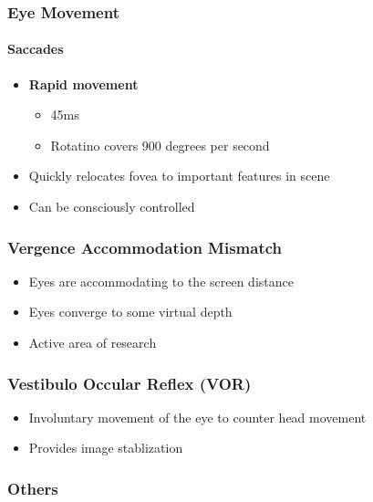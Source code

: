     \subsubsection{Eye Movement}

      \paragraph{Saccades}
      \begin{itemize}
        \item \textbf{Rapid movement}
        \begin{itemize}
          \item 45ms
          \item Rotatino covers 900 degrees per second
        \end{itemize}

        \item Quickly relocates fovea to important features in scene
        \item Can be consciously controlled
      \end{itemize}

    \subsubsection{Vergence Accommodation Mismatch}

      \begin{itemize}
        \item Eyes are accommodating to the screen distance
        \item Eyes converge to some virtual depth
        \item Active area of research
      \end{itemize}

    \subsubsection{Vestibulo Occular Reflex (VOR)}

      \begin{itemize}
        \item Involuntary movement of the eye to counter head movement
        \item Provides image stablization
      \end{itemize}

    \subsubsection{Others}

